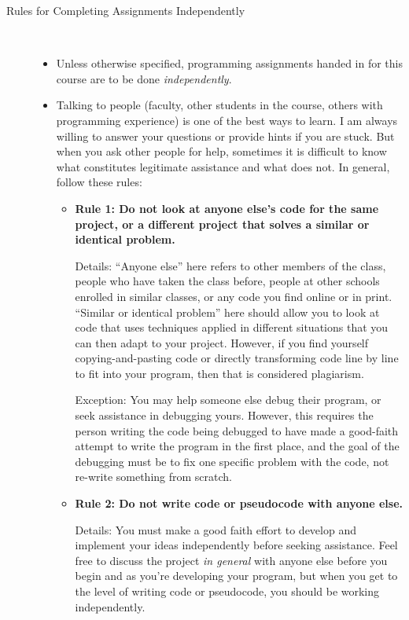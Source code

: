 \documentclass [letterpaper,11pt]{article}
\begin{document}
\begin{description}
\item[Rules for Completing Assignments Independently]\
\begin{itemize}
        \item Unless otherwise specified, programming assignments handed in for this course are to be done \emph{independently}.  
        \item Talking to people (faculty, other students in the course, others with programming experience) is one of the best ways to learn.  I am always willing to answer your questions or provide hints if you are stuck.  But when you ask other people for help, sometimes
        it is difficult to know what constitutes legitimate assistance and what does not.  In general, follow these rules:
        
        \begin{itemize}
                \item \textbf{Rule 1: Do not look at anyone else's code for the same project, or a different project that solves a similar 
                or identical problem.}
                
                Details: ``Anyone else'' here refers to other members of the class, people who have taken the class before, people at other
                schools enrolled in similar classes, or any code you find online or in print.  ``Similar or identical problem'' here should 
                allow you to look at code that uses techniques applied in different situations that you can then 
                adapt to your project.  However, if you find yourself copying-and-pasting code or directly transforming
                code line by line to fit into your program, then that is considered plagiarism.
                
                                
                Exception: You may help someone else debug their program, or seek assistance in debugging yours.  However, 
                this requires the person writing the code being debugged to have made a good-faith attempt
                to write the program in the first place, and the goal of the debugging must be to fix
                one specific problem with the code, not re-write something from scratch.
                
                \item \textbf{Rule 2: Do not write code or pseudocode with anyone else.}
                
                Details: You must make a good faith effort to develop and implement your ideas
                independently before seeking assistance.  Feel free to discuss the project \emph{in general} with anyone else
                before you begin and as you're developing your program, but when you get to the level of writing code or
                pseudocode, you should be working independently.
                

\end{itemize}
\end{itemize}
\end{description}
\end{document}
